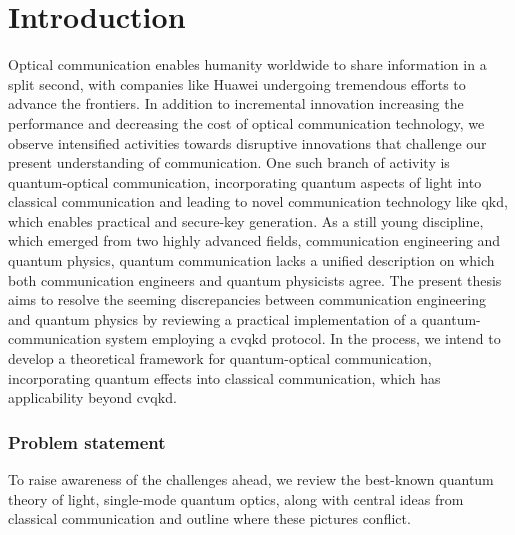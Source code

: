 \chapter*{Introduction}

Optical communication enables humanity worldwide to share information in a split second, with companies like Huawei undergoing tremendous efforts to advance the frontiers.
In addition to incremental innovation increasing the performance and decreasing the cost of optical communication technology, we observe intensified activities towards disruptive innovations that challenge our present understanding of communication.
One such branch of activity is quantum-optical communication, incorporating quantum aspects of light into classical communication and leading to novel communication technology like \gls{qkd}, which enables practical and secure-key generation.
As a still young discipline, which emerged from two highly advanced fields, communication engineering and quantum physics, quantum communication lacks a unified description on which both communication engineers and quantum physicists agree.
The present thesis aims to resolve the seeming discrepancies between communication engineering and quantum physics by reviewing a practical implementation of a quantum-communication system employing a \gls{cvqkd} protocol.
In the process, we intend to develop a theoretical framework for quantum-optical communication, incorporating quantum effects into classical communication, which has applicability beyond \gls{cvqkd}.

\subsection*{Problem statement}

To raise awareness of the challenges ahead, we review the best-known quantum theory of light, single-mode quantum optics, along with central ideas from classical communication and outline where these pictures conflict.

